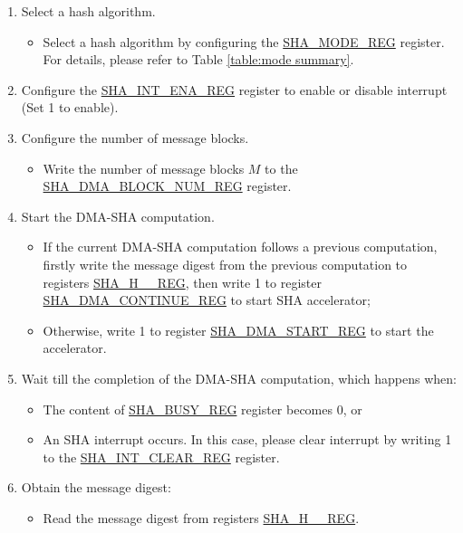 \documentclass[main\_\_EN.tex]{subfiles}
\begin{document}
\begin{enumerate}
    \item Select a hash algorithm.
    \begin{itemize}
        \item Select a hash algorithm by configuring the \hyperref[regdesc:SHAMODEREG]{SHA\_MODE\_REG} register. For details, please refer to Table \ref{table:mode summary}.
    \end{itemize}
    \item Configure the \hyperref[regdesc:SHAINTENAREG]{SHA\_INT\_ENA\_REG} register to enable or disable interrupt (Set 1 to enable).
    \item Configure the number of message blocks.
    \begin{itemize}
        \item  Write the number of message blocks \begin{math}M\end{math} to the  \hyperref[regdesc:SHADMABLOCKNUMREG]{SHA\_DMA\_BLOCK\_NUM\_REG} register.
    \end{itemize}
    \item Start the DMA-SHA computation.
        \begin{itemize}
            \item If the current DMA-SHA computation follows a previous computation, firstly write the message digest from the previous computation to registers \hyperref[regdesc:SHAHNREG]{SHA\_H\_\_REG}, then write 1 to register \hyperref[regdesc:SHADMACONTINUEREG]{SHA\_DMA\_CONTINUE\_REG} to start SHA accelerator;
            \item Otherwise, write 1 to register \hyperref[regdesc:SHADMASTARTREG]{SHA\_DMA\_START\_REG} to start the accelerator.
        \end{itemize}
    \item Wait till the completion of the DMA-SHA computation, which happens when:
        \begin{itemize}
            \item The content of \hyperref[regdesc:SHABUSYREG]{SHA\_BUSY\_REG} register becomes 0, or
            \item An SHA interrupt occurs. In this case, please clear interrupt by writing 1 to the \hyperref[regdesc:SHAINTCLEARREG]{SHA\_INT\_CLEAR\_REG} register.
        \end{itemize}

    \item Obtain the message digest:
    \begin{itemize}
        \item Read the message digest from registers \hyperref[regdesc:SHAHNREG]{SHA\_H\_\_REG}.
    \end{itemize}
\end{enumerate}
\end{document}

